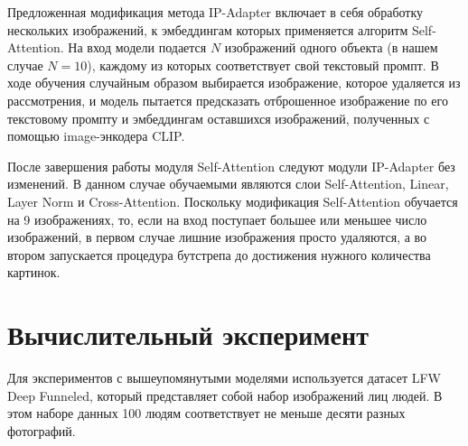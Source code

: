 \documentclass{article}
\begin{document}
Предложенная модификация метода IP-Adapter включает в себя обработку нескольких изображений, к эмбеддингам которых применяется алгоритм Self-Attention\cite{DBLP:journals/corr/VaswaniSPUJGKP17}. На вход модели подается $N$ изображений одного объекта (в нашем случае $N = 10$), каждому из которых соответствует свой текстовый промпт. В ходе обучения случайным образом выбирается изображение, которое удаляется из рассмотрения, и модель пытается предсказать отброшенное изображение по его текстовому промпту и эмбеддингам оставшихся изображений, полученных с помощью image-энкодера CLIP.

После завершения работы модуля Self-Attention следуют модули IP-Adapter без изменений. В данном случае обучаемыми являются слои Self-Attention, Linear, Layer Norm и Cross-Attention. Поскольку модификация Self-Attention обучается на 9 изображениях, то, если на вход поступает большее или меньшее число изображений, в первом случае лишние изображения просто удаляются, а во втором запускается процедура бутстрепа до достижения нужного количества картинок.

\section{Вычислительный эксперимент}
Для экспериментов с вышеупомянутыми моделями используется датасет LFW Deep Funneled, который представляет собой набор изображений лиц людей. В этом наборе данных 100 людям соответствует не меньше десяти разных фотографий. 
\end{document}
